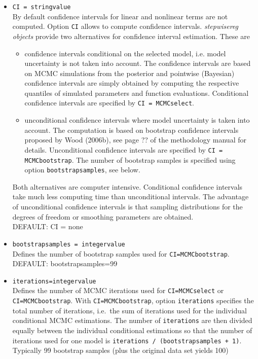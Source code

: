 \begin{itemize}
\item {\tt CI = stringvalue} \\
By default confidence intervals for linear and nonlinear terms are not computed. Option {\tt CI} allows to compute confidence intervals. {\em stepwisereg objects}
provide two alternatives for confidence interval estimation. These are
\begin{itemize}
\item confidence intervals conditional on the selected model, i.e. model uncertainty is not taken into account. The confidence intervals are
based on MCMC simulations from the posterior and pointwise (Bayesian) confidence intervals are simply obtained by computing the respective
quantiles of simulated parameters and function evaluations. Conditional confidence intervals are specified by {\tt CI = MCMCselect}.
\item unconditional confidence intervals where model uncertainty is taken into account. The computation is based on bootstrap confidence intervals
proposed by Wood (2006b), see page ?? of the methodology manual for details. Unconditional confidence intervals are specified by {\tt CI = MCMCbootstrap}.
The number of bootstrap samples is specified using option {\tt bootstrapsamples}, see below.
\end{itemize}
Both alternatives are computer intensive. Conditional confidence intervals take much less computing time than unconditional intervals. The advantage of
unconditional confidence intervals is that sampling distributions for the degrees of freedom or smoothing parameters are obtained. \\
DEFAULT: CI = none
\item {\tt bootstrapsamples = integervalue} \\
Defines the number of bootstrap samples used for {\tt CI=MCMCbootstrap}. \\
DEFAULT: bootstrapsamples=99
\item {\tt iterations=integervalue} \\
 Defines the number of MCMC iterations used for {\tt CI=MCMCselect} or
{\tt CI=MCMCbootstrap}. With {\tt CI=MCMCbootstrap}, option {\tt iterations} specifies the total number
of iterations, i.e.~the sum of iterations used for the individual conditional MCMC estimations.
The number of  {\tt iterations} are then divided equally between the individual conditional estimations so that the number of iterations
used for one model is {\tt iterations / (bootstrapsamples + 1)}. Typically 99 bootstrap samples (plus the original data set yields 100)

\end{itemize}
